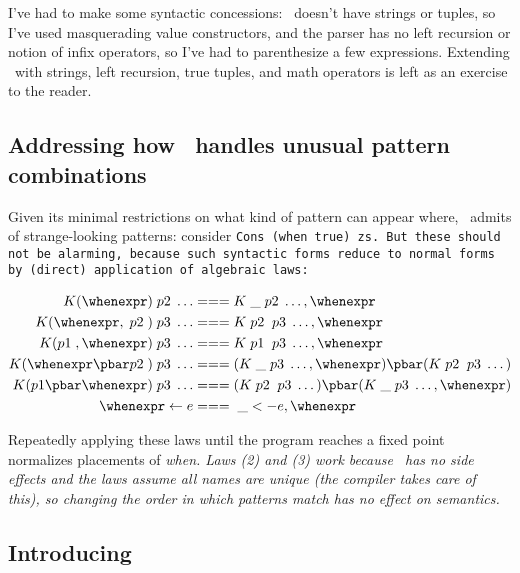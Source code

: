 \documentclass[manuscript,screen,review, 12pt, nonacm]{acmart}
\begin{document}
    I've had to make some syntactic concessions: \PPlus\ doesn't have strings or
    tuples, so I've used masquerading value constructors, and the parser has no
    left recursion or notion of infix operators, so I've had to parenthesize a
    few expressions. Extending \PPlus\ with strings, left recursion, true
    tuples, and math operators is left as an exercise to the reader. 
    
\subsection{Addressing how \PPlus\ handles unusual pattern combinations}
\label{ppweird}
    Given its minimal restrictions on what kind of pattern can appear where,
    \PPlus\ admits of strange-looking patterns: consider \tt{Cons (when true)
    zs}. But these should not be alarming, because such syntactic forms reduce
    to normal forms by (direct) application of algebraic laws: 

    \begin{align}
      K (\whenexpr) \;p2\; \dots &=== K \;\_ \;p2\; \dots, \whenexpr \\
      K (\whenexpr, \;p2\;) \;p3\; \dots  &=== K \;p2\; \;p3\; \dots, \whenexpr \\
      K (p1\;, \whenexpr) \;p3\; \dots  &=== K \;p1\; \;p3\; \dots, \whenexpr \\
      K (\whenexpr \pbar p2\;) \;p3\; \dots &=== (K \;\_ \;p3\; \dots, \whenexpr) \pbar (K \;p2\; \;p3\; \dots) \\
      K (p1 \pbar \whenexpr) \;p3\; \dots &=== (K \;p2\; \;p3\; \dots) \pbar (K \;\_ \;p3\; \dots, \whenexpr)  \\
      \whenexpr \leftarrow e &=== \;\_ <- e, \whenexpr
    \end{align}
    
    
    Repeatedly applying these laws until the program reaches a fixed point
    normalizes placements of \it{when}. Laws (2) and (3) work because \PPlus\
    has no side effects and the laws assume all names are unique (the compiler
    takes care of this), so changing the order in which patterns match has no
    effect on semantics.         


\subsection{Introducing \VMinus\ }
\label{vminus}
\end{document}
